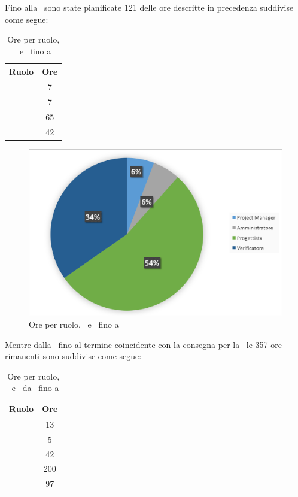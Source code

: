 \newpage
Fino alla \RP\ sono state pianificate 121 delle ore descritte in precedenza suddivise come segue:

\begin{table}[h]
	\begin{center}
		\begin{tabular}{|c|c|}
			\hline
			\textbf{Ruolo}	& \textbf{Ore} \\
			\hline
			\Pm &	7\\
			\hline
			\Am	&	7\\
			\hline
			\Prog	&	65\\
			\hline
			\Ver	&	42\\
			\hline
		\end{tabular}
	\end{center}
	\caption{Ore per ruolo, \PD\ e \COD\ fino a \RP}
\end{table}

\begin{figure}[H]
	\centering 
	\includegraphics[scale=0.7]{Immagini/GraficiTorte/PD.png}
	\caption{Ore per ruolo, \PD\ e \COD\ fino a \RP}
\end{figure}

\newpage
Mentre dalla \RP\ fino al termine coincidente con la consegna per la \RQ\ le 357 ore rimanenti sono suddivise come segue:

\begin{table}[h]
	\begin{center}
		\begin{tabular}{|c|c|}
			\hline
			\textbf{Ruolo}	& \textbf{Ore} \\
			\hline
			\Pm &	13\\
			\hline
			\Am	&	5\\
			\hline
			\Prog	&	42\\
			\hline
			\Progr	&	200\\
			\hline
			\Ver	&	97\\
			\hline
		\end{tabular}
	\end{center}
	\caption{Ore per ruolo, \PD\ e \COD\ da \RP\ fino a \RQ}
\end{table}

